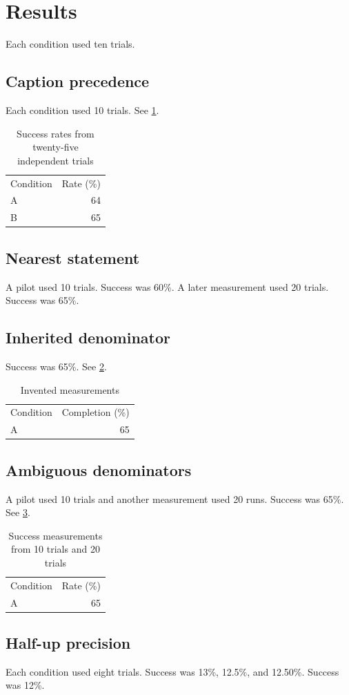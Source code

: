 \section{Results}
Each condition used ten trials.
\subsection{Caption precedence}
Each condition used 10 trials.
See \ref{tab:caption}.
\begin{table}
\caption{Success rates from twenty-five independent trials}\label{tab:caption}
\begin{tabular}{lr}Condition & Rate (\%) \\ A & 64 \\ B & 65 \\ \end{tabular}
\end{table}
\subsection{Nearest statement}
A pilot used 10 trials.
Success was 60\%.
A later measurement used 20 trials.
Success was 65\%.
\subsection{Inherited denominator}
Success was 65\%.
See \ref{tab:header}.
\begin{table}\caption{Invented measurements}\label{tab:header}
\begin{tabular}{lr}Condition & Completion (\%) \\ A & 65 \\ \end{tabular}
\end{table}
\subsection{Ambiguous denominators}
A pilot used 10 trials and another measurement used 20 runs.
Success was 65\%.
See \ref{tab:ambiguous}.
\begin{table}
\caption{Success measurements from 10 trials and 20 trials}\label{tab:ambiguous}
\begin{tabular}{lr}Condition & Rate (\%) \\ A & 65 \\ \end{tabular}
\end{table}
\subsection{Half-up precision}
Each condition used eight trials.
Success was 13\%, 12.5\%, and 12.50\%.
Success was 12\%.
